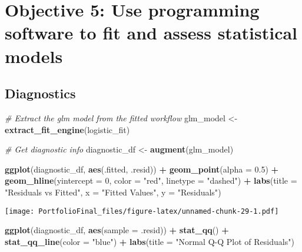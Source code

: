 \documentclass[
]{article}
\newenvironment{Shaded}{\begin{snugshade}}{\end{snugshade}}
\newcommand{\AttributeTok}[1]{\textcolor[rgb]{0.13,0.29,0.53}{#1}}
\newcommand{\CommentTok}[1]{\textcolor[rgb]{0.56,0.35,0.01}{\textit{#1}}}
\newcommand{\DecValTok}[1]{\textcolor[rgb]{0.00,0.00,0.81}{#1}}
\newcommand{\FloatTok}[1]{\textcolor[rgb]{0.00,0.00,0.81}{#1}}
\newcommand{\FunctionTok}[1]{\textcolor[rgb]{0.13,0.29,0.53}{\textbf{#1}}}
\newcommand{\NormalTok}[1]{#1}
\newcommand{\OtherTok}[1]{\textcolor[rgb]{0.56,0.35,0.01}{#1}}
\newcommand{\SpecialCharTok}[1]{\textcolor[rgb]{0.81,0.36,0.00}{\textbf{#1}}}
\newcommand{\StringTok}[1]{\textcolor[rgb]{0.31,0.60,0.02}{#1}}
\begin{document}
\section{Objective 5: Use programming software to fit and assess
statistical
models}\label{objective-5-use-programming-software-to-fit-and-assess-statistical-models}

\subsection{Diagnostics}\label{diagnostics}

\begin{Shaded}
\begin{Highlighting}[]
\CommentTok{\# Extract the glm model from the fitted workflow}
\NormalTok{glm\_model }\OtherTok{\textless{}{-}} \FunctionTok{extract\_fit\_engine}\NormalTok{(logistic\_fit)}

\CommentTok{\# Get diagnostic info}
\NormalTok{diagnostic\_df }\OtherTok{\textless{}{-}} \FunctionTok{augment}\NormalTok{(glm\_model)}

\FunctionTok{ggplot}\NormalTok{(diagnostic\_df, }\FunctionTok{aes}\NormalTok{(.fitted, .resid)) }\SpecialCharTok{+}
  \FunctionTok{geom\_point}\NormalTok{(}\AttributeTok{alpha =} \FloatTok{0.5}\NormalTok{) }\SpecialCharTok{+}
  \FunctionTok{geom\_hline}\NormalTok{(}\AttributeTok{yintercept =} \DecValTok{0}\NormalTok{, }\AttributeTok{color =} \StringTok{"red"}\NormalTok{, }\AttributeTok{linetype =} \StringTok{"dashed"}\NormalTok{) }\SpecialCharTok{+}
  \FunctionTok{labs}\NormalTok{(}\AttributeTok{title =} \StringTok{"Residuals vs Fitted"}\NormalTok{, }\AttributeTok{x =} \StringTok{"Fitted Values"}\NormalTok{, }\AttributeTok{y =} \StringTok{"Residuals"}\NormalTok{)}
\end{Highlighting}
\end{Shaded}

\texttt{[image: PortfolioFinal\_files/figure-latex/unnamed-chunk-29-1.pdf]}

\begin{Shaded}
\begin{Highlighting}[]
\FunctionTok{ggplot}\NormalTok{(diagnostic\_df, }\FunctionTok{aes}\NormalTok{(}\AttributeTok{sample =}\NormalTok{ .resid)) }\SpecialCharTok{+}
  \FunctionTok{stat\_qq}\NormalTok{() }\SpecialCharTok{+}
  \FunctionTok{stat\_qq\_line}\NormalTok{(}\AttributeTok{color =} \StringTok{"blue"}\NormalTok{) }\SpecialCharTok{+}
  \FunctionTok{labs}\NormalTok{(}\AttributeTok{title =} \StringTok{"Normal Q{-}Q Plot of Residuals"}\NormalTok{)}
\end{Highlighting}
\end{Shaded}
\end{document}
